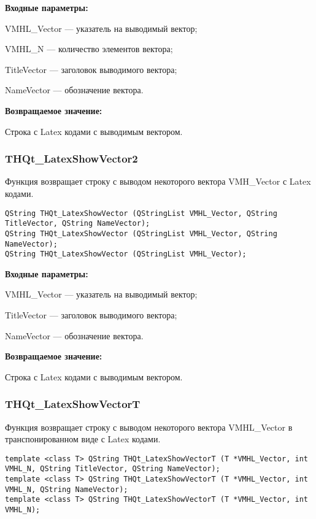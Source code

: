 \documentclass[a4paper,12pt]{article}
\begin{document}
\textbf{Входные параметры:}
 
    VMHL\_Vector --- указатель на выводимый вектор;
 
    VMHL\_N --- количество элементов вектора;
 
    TitleVector --- заголовок выводимого вектора;
 
    NameVector --- обозначение вектора.
	
\textbf{Возвращаемое значение:}

Строка с Latex кодами с выводимым вектором.


\subsubsection{THQt\_LatexShowVector2}\label{THQt_LatexShowVector2}

Функция возвращает строку с выводом некоторого вектора VMH\_Vector с Latex кодами.


\begin{lstlisting}[label=code_syntax_THQt_LatexShowVector2,caption=Синтаксис]
QString THQt_LatexShowVector (QStringList VMHL_Vector, QString TitleVector, QString NameVector);
QString THQt_LatexShowVector (QStringList VMHL_Vector, QString NameVector);
QString THQt_LatexShowVector (QStringList VMHL_Vector);
\end{lstlisting}

\textbf{Входные параметры:}
 
    VMHL\_Vector --- указатель на выводимый вектор;
 
    TitleVector --- заголовок выводимого вектора;
 
    NameVector --- обозначение вектора.
	
\textbf{Возвращаемое значение:}

Строка с Latex кодами с выводимым вектором.


\subsubsection{THQt\_LatexShowVectorT}\label{THQt_LatexShowVectorT}

Функция возвращает строку с выводом некоторого вектора VMHL\_Vector в транспонированном виде с Latex кодами.


\begin{lstlisting}[label=code_syntax_THQt_LatexShowVectorT,caption=Синтаксис]
template <class T> QString THQt_LatexShowVectorT (T *VMHL_Vector, int VMHL_N, QString TitleVector, QString NameVector);
template <class T> QString THQt_LatexShowVectorT (T *VMHL_Vector, int VMHL_N, QString NameVector);
template <class T> QString THQt_LatexShowVectorT (T *VMHL_Vector, int VMHL_N);
\end{lstlisting}
\end{document}
